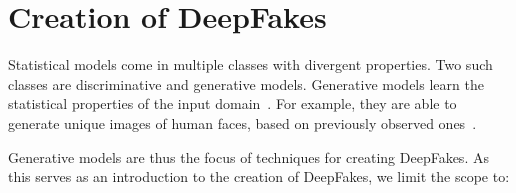 \section{Creation of DeepFakes}\label{sect:creation-of-deepfakes}
Statistical models come in multiple classes with divergent properties.
Two such classes are discriminative and generative models. Generative models
learn the statistical properties of the input domain~\cite[cf.][\nopp{}651\psqq]{Goodfellow.2016}.
For example, they are able to generate unique images of human faces, based on
previously observed ones~\cite{Karras.2019}.

\par
Generative models are thus the focus of techniques for creating DeepFakes. As
this serves as an introduction to the creation of DeepFakes, we limit the scope
to:
